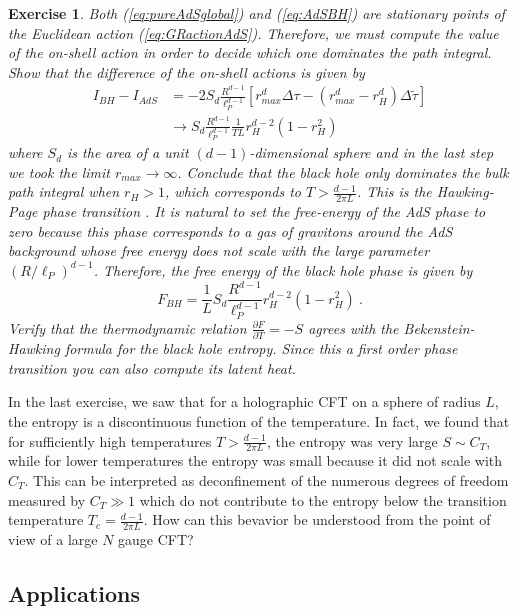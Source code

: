 \documentclass{ws-rv9x6}
\newtheorem{exercise}{Exercise}[section]
\newcommand\be{\begin{equation}}
\newcommand\ee{\end{equation}}
\begin{document}
\begin{exercise}
Both (\ref{eq:pureAdSglobal}) and (\ref{eq:AdSBH}) are stationary
points of the Euclidean action (\ref{eq:GRactionAdS}). Therefore,
we must compute the value of the on-shell action in order to decide
which one dominates the path integral. Show that the difference of
the on-shell actions is given by
\begin{align}
I_{BH}-I_{AdS}&=-2S_{d}\frac{R^{d-1}}{\ell_{P}^{d-1}}\left[r_{max}^{d}\Delta\tau-\left(r_{max}^{d}-r_{H}^{d}\right)\Delta\tilde{\tau}\right]\\
&\longrightarrow S_{d}\frac{R^{d-1}}{\ell_{P}^{d-1}}\frac{1}{TL}r_{H}^{d-2}(1-r_{H}^{2})
\end{align}
where $S_{d}$ is the area of a unit $(d-1)$-dimensional sphere and
in the last step we took the limit $r_{max}\to\infty$. Conclude that
the black hole only dominates the bulk path integral when $r_{H}>1$,
which corresponds to $T>\frac{d-1}{2\pi L}$. This is the Hawking-Page
phase transition \cite{Hawking:1982dh}. It is natural to set the
free-energy of the AdS phase to zero because this phase corresponds
to a gas of gravitons around the AdS background whose free energy
does not scale with the large parameter $(R/\ell_{P})^{d-1}$. Therefore,
the free energy of the black hole phase is given by
\be
F_{BH}=\frac{1}{L}S_{d}\frac{R^{d-1}}{\ell_{P}^{d-1}}r_{H}^{d-2}(1-r_{H}^{2})\ .
\ee
Verify that the thermodynamic relation $\frac{\partial F}{\partial T}=-S$
agrees with the Bekenstein-Hawking formula for the black hole entropy.
Since this a first order phase transition you can also compute its
latent heat.
\end{exercise} 

In the last exercise, we saw that for a holographic CFT on a sphere
of radius $L$, the entropy is a discontinuous function of the temperature.
In fact, we found that for sufficiently high temperatures $T>\frac{d-1}{2\pi L}$,
the entropy was very large $S\sim C_{T}$, while for lower temperatures
the entropy was small because it did not scale with $C_{T}$. This
can be interpreted as deconfinement of the numerous degrees of freedom
measured by $C_{T}\gg1$ which do not contribute to the entropy below
the transition temperature $T_{c}=\frac{d-1}{2\pi L}$. How can this
bevavior be understood from the point of view of a large $N$ gauge
CFT?




\subsection{Applications\label{sub:Applications}}
\end{document}
